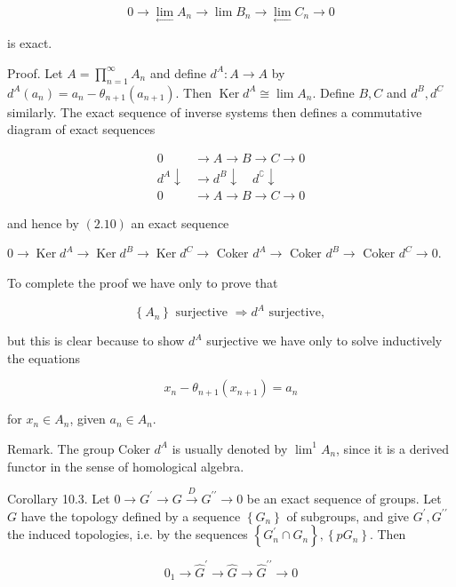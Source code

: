 \documentclass{standalone}
\theoremstyle{definition}
\theoremstyle{remark}
\begin{document}
\[
0 \rightarrow \lim _{\longleftarrow} A_{n} \rightarrow \lim B_{n} \rightarrow \lim _{\leftarrow} C_{n} \rightarrow 0
\]

is exact.

Proof. Let $A=\prod_{n=1}^{\infty} A_{n}$ and define $d^{A}: A \rightarrow A$ by $d^{A}\left(a_{n}\right)=a_{n}-\theta_{n+1}\left(a_{n+1}\right)$. Then $\operatorname{Ker} d^{A} \cong \lim A_{n}$. Define $B, C$ and $d^{B}, d^{C}$ similarly. The exact sequence of inverse systems then defines a commutative diagram of exact sequences

\[
\begin{aligned}
0 & \rightarrow A \rightarrow B \rightarrow C \rightarrow 0 \\
d^{A} \downarrow & \rightarrow d^{B} \downarrow \quad d^{\complement} \downarrow \\
0 & \rightarrow A \rightarrow B \rightarrow C \rightarrow 0
\end{aligned}
\]

and hence by $(2.10)$ an exact sequence

$0 \rightarrow \operatorname{Ker} d^{A} \rightarrow \operatorname{Ker} d^{B} \rightarrow \operatorname{Ker} d^{C} \rightarrow$ Coker $d^{A} \rightarrow$ Coker $d^{B} \rightarrow$ Coker $d^{C} \rightarrow 0$.

To complete the proof we have only to prove that

\[
\left\{A_{n}\right\} \text { surjective } \Rightarrow d^{A} \text { surjective, }
\]

but this is clear because to show $d^{A}$ surjective we have only to solve inductively the equations

\[
x_{n}-\theta_{n+1}\left(x_{n+1}\right)=a_{n}
\]

for $x_{n} \in A_{n}$, given $a_{n} \in A_{n}$.

Remark. The group Coker $d^{A}$ is usually denoted by $\lim ^{1} A_{n}$, since it is a derived functor in the sense of homological algebra.

Corollary 10.3. Let $0 \rightarrow G^{\prime} \rightarrow G \stackrel{D}{\rightarrow} G^{\prime \prime} \rightarrow 0$ be an exact sequence of groups. Let $G$ have the topology defined by a sequence $\left\{G_{n}\right\}$ of subgroups, and give $G^{\prime}, G^{\prime \prime}$ the induced topologies, i.e. by the sequences $\left\{G_{n}^{\prime} \cap G_{n}\right\},\left\{p G_{n}\right\}$. Then

\[
0_{1} \rightarrow \hat{G}^{\prime} \rightarrow \hat{G} \rightarrow \hat{G}^{\prime \prime} \rightarrow 0
\]
\end{document}
